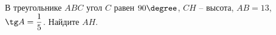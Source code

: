 \begin{ex}
	\begin{condition}
		В треугольнике \( ABC \) угол \( C \) равен \( 90\degree \), \( CH \) – высота, \( AB=13 \),  \( \tg A=\dfrac{1}{5} \). Найдите \( AH \).
	\end{condition}
\end{ex}